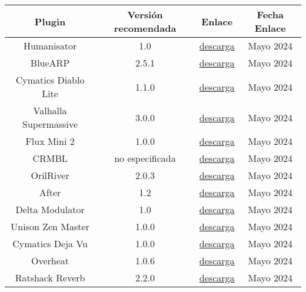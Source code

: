 \begin{table}[h]
    \centering
	\begin{tabular}{c|c|c|c}
		\textbf{Plugin} & \textbf{Versión recomendada} & \textbf{Enlace} & \textbf{Fecha Enlace} \\
		\hline\hline
		Humanisator & 1.0 & \href{https://plugins4free.com/plugin/1562/}{descarga} & Mayo 2024\\
		BlueARP & 2.5.1 & \href{https://omg-instruments.com/wp/}{descarga} & Mayo 2024\\
		Cymatics Diablo Lite & 1.1.0 & \href{https://cymatics.fm/pages/diablo-lite}{descarga} & Mayo 2024\\	
            Valhalla Supermassive & 3.0.0 & \href{https://valhalladsp.com/shop/reverb/valhalla-supermassive/}{descarga} & Mayo 2024\\

            Flux Mini 2 & 1.0.0 & \href{https://www.caelumaudio.com/CaelumAudio/?Page=FluxMini2}{descarga} & Mayo 2024\\
            
            CRMBL & no especificada & \href{https://vst.unplug.red/crmbl}{descarga} & Mayo 2024\\
            
            OrilRiver & 2.0.3 & \href{https://plugins4free.com/plugin/2538/}{descarga} & Mayo 2024\\
            
            After & 1.2 & \href{https://plugins4free.com/plugin/1728/}{descarga} & Mayo 2024\\
            
            Delta Modulator & 1.0 & \href{https://plugins4free.com/plugin/1225/}{descarga} & Mayo 2024\\
            
            Unison Zen Master & 1.0.0 & \href{https://unison.audio/zen-master}{descarga} & Mayo 2024\\
            
            Cymatics Deja Vu & 1.0.0 & \href{https://cymatics.fm/products/deja-vu-plugin}{descarga} & Mayo 2024\\
            
            Overheat & 1.0.6 & \href{https://sampleson.com/overheat.html}{descarga} & Mayo 2024\\
            
            Ratshack Reverb & 2.2.0 & \href{https://plugins4free.com/plugin/3729/}{descarga} & Mayo 2024\\
            

\end{tabular}
\end{table}
